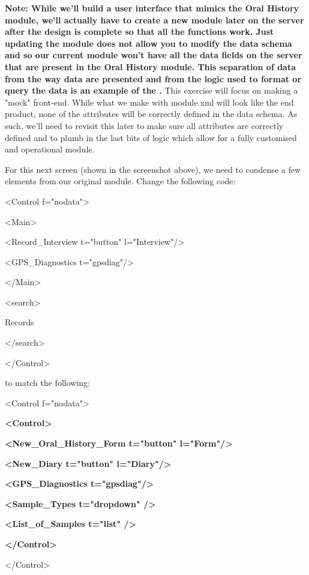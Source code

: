 {\bf Note: While we'll build a user interface that mimics the Oral History module, we'll actually have to create a new module later on the server after the design is complete so that all the functions work. Just updating the module does not allow you to modify the data schema and so our current module won't have all the data fields on the server that are present in the Oral History module. This separation of data from the way data are presented and from the logic used to format or query the data is an example of the \from[url23].} This exercise will focus on making a "mock" front-end. While what we make with module.xml will look like the end product, none of the attributes will be correctly defined in the data schema. As such, we'll need to revisit this later to make sure all attributes are correctly defined and to plumb in the last bits of logic which allow for a fully customised and operational module.

{}

For this next screen (shown in the screenshot above), we need to condense a few elements from our original module. Change the following code:

<Control f="nodata">

<Main>

<Record_Interview t="button" l="Interview"/>

<GPS_Diagnostics t="gpsdiag"/>

</Main>

<search>

Records

</search>

</Control>

to match the following:

<Control f="nodata">

{\bf <Control>}

{\bf <New_Oral_History_Form t="button" l="Form"/>}

{\bf <New_Diary t="button" l="Diary"/>}

{\bf <GPS_Diagnostics t="gpsdiag"/>}

{\bf <Sample_Types t="dropdown" />}

{\bf <List_of_Samples t="list" />}

{\bf </Control>}

</Control>

